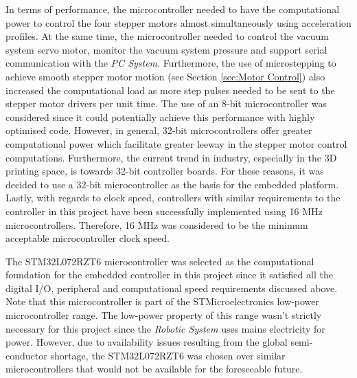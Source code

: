 In terms of performance, the microcontroller needed to have the computational power to control the four stepper motors almost simultaneously using acceleration profiles. At the same time, the microcontroller needed to control the vacuum system servo motor, monitor the vacuum system pressure and support serial communication with the \textit{PC System}. Furthermore, the use of microstepping to achieve smooth stepper motor motion (see Section \ref{sec:Motor Control}) also increased the computational load as more step pulses needed to be sent to the stepper motor drivers per unit time. The use of an 8-bit microcontroller was considered since it could potentially achieve this performance with highly optimised code. However, in general, 32-bit microcontrollers offer greater computational power which facilitate greater leeway in the stepper motor control computations. Furthermore, the current trend in industry, especially in the 3D printing space, is towards 32-bit controller boards. For these reasons, it was decided to use a 32-bit microcontroller as the basis for the embedded platform. Lastly, with regards to clock speed, controllers with similar requirements to the controller in this project have been successfully implemented using 16 MHz microcontrollers. Therefore, 16 MHz was considered to be the minimum acceptable microcontroller clock speed.

The STM32L072RZT6 microcontroller was selected as the computational foundation for the embedded controller in this project since it satisfied all the digital I/O, peripheral and computational speed requirements discussed above. Note that this microcontroller is part of the STMicroelectronics low-power microcontroller range. The low-power property of this range wasn't strictly necessary for this project since the \textit{Robotic System} uses mains electricity for power. However, due to availability issues resulting from the global semi-conductor shortage, the STM32L072RZT6 was chosen over similar microcontrollers that would not be available for the foreseeable future.


